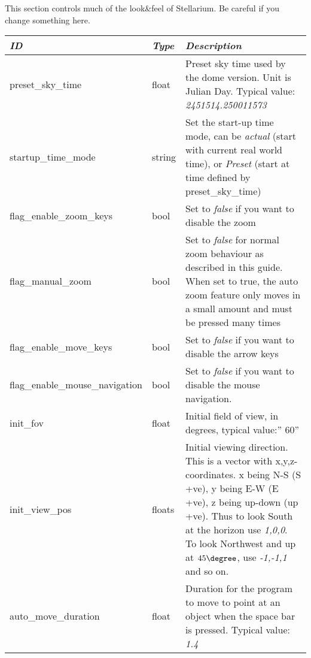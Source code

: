 \section{}\label{sec:config.ini:navigation}

This section controls much of the look\&feel of Stellarium. Be careful if you change something here.


\begin{longtabu} to \textwidth {l|l|X}\toprule
\emph{ID}              & \emph{Type} & \emph{Description}\\\midrule
preset\_sky\_time        & float & Preset sky time used by the dome version. Unit is Julian Day. Typical value: \emph{2451514.250011573}\\\midrule
startup\_time\_mode      & string & Set the start-up time mode, can be \emph{actual} (start with current real world time), 
                                    or \emph{Preset} (start at time defined by preset\_sky\_time)\\\midrule
flag\_enable\_zoom\_keys & bool & Set to \emph{false} if you want to disable the zoom\\\midrule
flag\_manual\_zoom       & bool & Set to \emph{false} for normal zoom behaviour as described in this guide. 
                                  When set to true, the auto zoom feature only moves in a small amount and must be pressed many times\\\midrule
flag\_enable\_move\_keys & bool & Set to \emph{false} if you want to disable the arrow keys\\\midrule
flag\_enable\_mouse\_navigation & bool & Set to \emph{false} if you want to disable the mouse navigation.\\\midrule
init\_fov                       & float & Initial field of view, in degrees, typical value:'' 60''\\\midrule
init\_view\_pos                 & floats & Initial viewing direction. This is a vector with x,y,z-coordinates. x being N-S (S +ve), 
                                  y being E-W (E +ve), z being up-down (up +ve). Thus to look South at the horizon use \emph{1,0,0}. 
                                  To look Northwest and up at $45\degree$, use \emph{-1,-1,1} and so on.\\\midrule
auto\_move\_duration            & float & Duration for the program to move to point at an object when the space bar is pressed. Typical value: \emph{1.4}\\\midrule

\end{longtabu}
